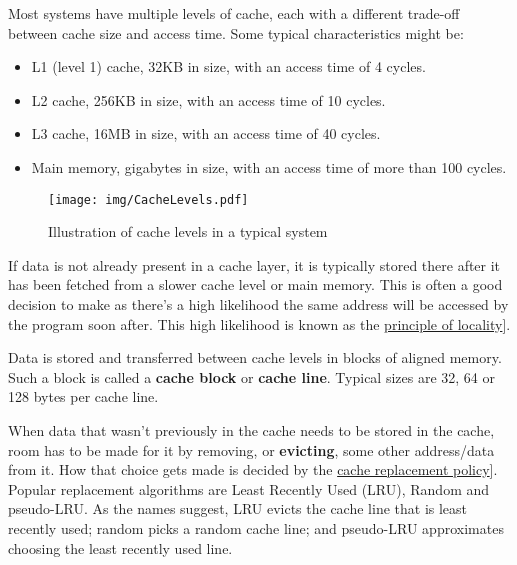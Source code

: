 \documentclass[
  a4paper,
]{report}
\providecommand{\tightlist}{%
  \setlength{\itemsep}{0pt}\setlength{\parskip}{0pt}}
\begin{document}
Most systems have \label{__index_entry_109}{multiple
levels of cache}, each with a different
trade-off between \label{__index_entry_110}{cache
size} and
\label{__index_entry_111}{access
time}. Some typical characteristics might be:

\begin{itemize}
\tightlist
\item
  L1 (level 1) cache, 32KB in size, with an access time of 4 cycles.
\item
  L2 cache, 256KB in size, with an access time of 10 cycles.
\item
  L3 cache, 16MB in size, with an access time of 40 cycles.
\item
  Main memory, gigabytes in size, with an access time of more than 100
  cycles.
\end{itemize}

\begin{figure}
\centering
\texttt{[image: img/CacheLevels.pdf]}
\caption{Illustration of cache levels in a typical system}
\end{figure}

If data is not already present in a cache layer, it is typically stored
there after it has been fetched from a slower cache level or main
memory. This is often a good decision to make as there's a high
likelihood the same address will be accessed by the program soon after.
This high likelihood is known as the
\href{https://en.wikipedia.org/wiki/Locality_of_reference}{\label{__index_entry_112}{principle
of
locality}}{]}\label{__index_entry_113}{}.

Data is stored and transferred between cache levels in blocks of aligned
memory. Such a block is called a
\textbf{\label{__index_entry_114}{cache
block}} or
\textbf{\label{__index_entry_115}{cache
line}}. Typical sizes are 32, 64 or 128 bytes per
cache line.

When data that wasn't previously in the cache needs to be stored in the
cache, room has to be made for it by removing, or
\textbf{\label{__index_entry_116}{evicting}},
some other address/data from it. How that choice gets made is decided by
the
\href{https://en.wikipedia.org/wiki/Cache_replacement_policies}{\label{__index_entry_117}{cache
replacement policy}}{]}. Popular
replacement algorithms are
\label{__index_entry_118}{Least Recently Used
(LRU)},
\label{__index_entry_119}{Random}
and
\label{__index_entry_120}{pseudo-LRU}.
As the names suggest, LRU evicts the cache line that is least recently
used; random picks a random cache line; and pseudo-LRU approximates
choosing the least recently used line.
\end{document}
